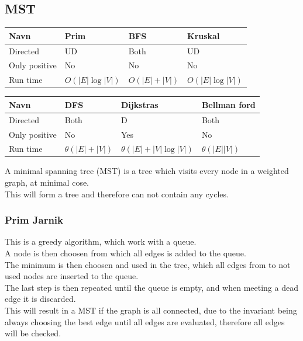\documentclass[12pt, a4paper]{article}
\begin{document}
		\subsection{MST}
		\begin{table}[h!]
				  \begin{tabular}{|l|l|l|l|}
							 \hline
							 Navn & Prim & BFS & Kruskal \\ \hline
							 Directed & UD & Both & UD \\ \hline
							 Only positive & No & No & No \\ \hline
							 Run time & $O(|E|\log |V|)$ & $O(|E|+|V|)$ & $O(|E|\log |V|)$ \\ \hline
				  \end{tabular}
		\end{table}
		\begin{table}[h!]
				  \begin{tabular}{|l|l|l|l|}
							 \hline
							 Navn & DFS & Dijkstras & Bellman ford \\ \hline
							 Directed & Both & D & Both \\ \hline
							 Only positive & No & Yes & No \\ \hline
							 Run time & $\theta(|E|+|V|)$ & $\theta(|E|+|V|\log|V|)$ & $\theta(|E||V|)$ \\ \hline
				  \end{tabular}
		\end{table}
			A minimal spanning tree (MST) is a tree which visits every node in a weighted graph, at minimal cose.\\
			This will form a tree and therefore can not contain any cycles.\\
			\subsubsection{Prim Jarnik}
				This is a greedy algorithm, which work with a queue.\\
				A node is then choosen from which all edges is added to the queue.\\
				The minimum is then choosen and used in the tree, which all edges from to not used nodes are inserted to the queue.\\
				The last step is then repeated until the queue is empty, and when meeting a dead edge it is discarded.\\
				This will result in a MST if the graph is all connected, due to the invariant being always choosing the best edge until all edges are evaluated, therefore all edges will be checked.
\end{document}
